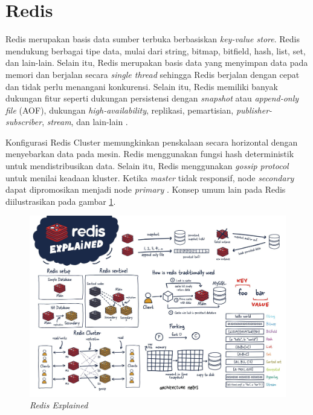 \section{Redis}

Redis merupakan basis data sumber terbuka berbasiskan \textit{key-value store}. Redis mendukung berbagai tipe data, mulai dari string, bitmap, bitfield, hash, list, set, dan lain-lain. Selain itu, Redis merupakan basis data yang menyimpan data pada memori dan berjalan secara \textit{single thread} sehingga Redis berjalan dengan cepat dan tidak perlu menangani konkurensi. Selain itu, Redis memiliki banyak dukungan fitur seperti dukungan persistensi dengan \textit{snapshot} atau \textit{append-only file} (AOF), dukungan \textit{high-availability}, replikasi, pemartisian, \textit{publisher-subscriber}, \textit{stream}, dan lain-lain \parencite{redisExplained}.

Konfigurasi Redis Cluster memungkinkan penskalaan secara horizontal dengan menyebarkan data pada mesin. Redis menggunakan fungsi hash deterministik untuk mendistribusikan data. Selain itu, Redis menggunakan \textit{gossip protocol} untuk menilai keadaan kluster. Ketika \textit{master} tidak responsif, node \textit{secondary} dapat dipromosikan menjadi node \textit{primary} \parencite{redisExplained}. Konsep umum lain pada Redis diilustrasikan pada gambar \ref{fig:redis-explained}.

\begin{figure}[htbp]
    \centering
    \includegraphics[width=1\textwidth]{resources/chapter-2/redis.jpg}
    \caption{\textit{Redis Explained \parencite{redisExplained}}}
    \label{fig:redis-explained}
\end{figure}
